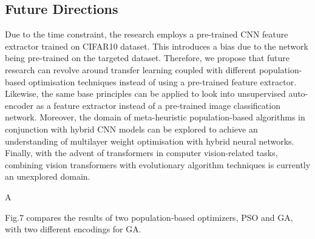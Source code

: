 \documentclass[conference]{IEEEtran}
\begin{document}
\subsection{Future Directions }
Due to the time constraint, the research employs a pre-trained CNN feature extractor trained on CIFAR10 dataset. This introduces a bias due to the network being pre-trained on the targeted dataset. Therefore, we propose that future research can revolve around transfer learning coupled with different population-based optimisation techniques instead of using a pre-trained feature extractor. Likewise, the same base principles can be applied to look into unsupervised auto-encoder as a feature extractor instead of a pre-trained image classification network. Moreover, the domain of meta-heuristic population-based algorithms in conjunction with hybrid CNN models can be explored to achieve an understanding of multilayer weight optimisation with hybrid neural networks. Finally, with the advent of transformers in computer vision-related tasks, combining vision transformers with evolutionary algorithm techniques is currently an unexplored domain.




\vspace{2em}
\appendix




A
\\
\begin{figure}[!ht]

\centering{}

\caption{}
\label{fig:cnnj}
\end{figure}
\par
\noindent
Fig.7 compares the results of two population-based optimizers, PSO and GA, with two different encodings for GA. 
\end{document}
